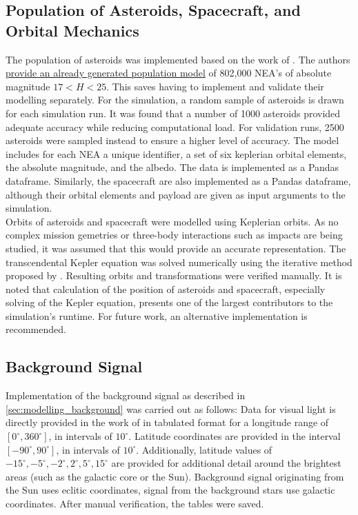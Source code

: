 \subsection{Population of Asteroids, Spacecraft, and Orbital Mechanics}
The population of asteroids was implemented based on the work of \cite{GranvikPopulation}. The authors \href{http://www.iki.fi/mgranvik/data/Granvik+\_2018\_Icarus}{provide an already generated population model} of 802,000 NEA's of absolute magnitude $17 < H < 25$. This saves having to implement and validate their modelling separately. For the simulation, a random sample of asteroids is drawn for each simulation run. It was found that a number of 1000 asteroids provided adequate accuracy while reducing computational load. For validation runs, 2500 asteroids were sampled instead to ensure a higher level of accuracy. The model includes for each NEA a unique identifier, a set of six keplerian orbital elements, the absolute magnitude, and the albedo. The data is implemented as a Pandas dataframe. Similarly, the spacecraft are also implemented as a Pandas dataframe, although their orbital elements and payload are given as input arguments to the simulation. \\

Orbits of asteroids and spacecraft were modelled using Keplerian orbits. As no complex mission gemetries or three-body interactions such as impacts are being studied, it was assumed that this would provide an accurate representation. The transcendental Kepler equation was solved numerically using the iterative method proposed by \cite{KeplerEquation}. Resulting orbits and transformations were verified manually. It is noted that calculation of the position of asteroids and spacecraft, especially solving of the Kepler equation, presents one of the largest contributors to the simulation's runtime. For future work, an alternative implementation is recommended.

\subsection{Background Signal}
Implementation of the background signal as described in \autoref{sec:modelling_background} was carried out as follows: Data for visual light is directly provided in the work of \cite{LightOfTheNightSky} in tabulated format for a longitude range of $[0^\circ, 360^\circ]$, in intervals of $10^\circ$. Latitude coordinates are provided in the interval $[-90^\circ, 90^\circ]$, in intervals of $10^\circ$. Additionally, latitude values of $-15^\circ, -5^\circ, -2^\circ, 2^\circ, 5^\circ, 15^\circ$ are provided for additional detail around the brightest areas (such as the galactic core or the Sun). Background signal originating from the Sun uses eclitic coordinates, signal from the background stars use galactic coordinates. After manual verification, the tables were saved. \\

